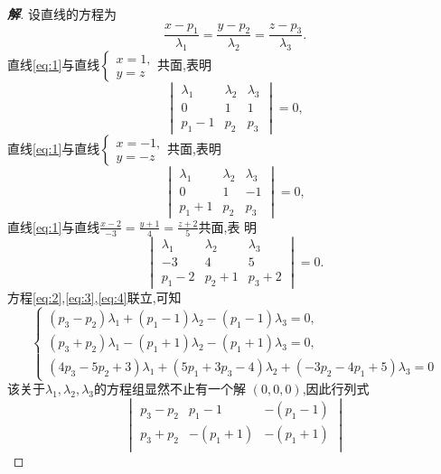 \documentclass[a4paper]{article}
\begin{document}
\begin{proof}[\textbf{解}]
 设直线的方程为
 \begin{equation}
   \label{eq:1}
   \frac{x-p_1}{\lambda_1}=\frac{y-p_2}{\lambda_2}=\frac{z-p_3}{\lambda_3}.
 \end{equation}
直线\eqref{eq:1}与直线$
\begin{cases}
  x=1,\\
y=z
\end{cases}
$共面,表明
\begin{equation}\label{eq:2}
\begin{vmatrix}
  \lambda_1&\lambda_2&\lambda_3\\
0&1&1\\
p_1-1&p_2&p_3
\end{vmatrix}=0,
\end{equation}
直线\eqref{eq:1}与直线$
\begin{cases}
  x=-1,\\
y=-z
\end{cases}
$共面,表明
\begin{equation}
  \label{eq:3}
  \begin{vmatrix}
    \lambda_1&\lambda_2&\lambda_3\\
0&1&-1\\
p_1+1&p_2&p_3
  \end{vmatrix}=0,
\end{equation}
直线\eqref{eq:1}与直线$\frac{x-2}{-3}=\frac{y+1}{4}=\frac{z+2}{5}$共面,表
明
\begin{equation}
  \label{eq:4}
  \begin{vmatrix}
    \lambda_1&\lambda_2&\lambda_3\\
-3&4&5\\
p_1-2&p_2+1&p_3+2
  \end{vmatrix}=0.
\end{equation}
方程\eqref{eq:2},\eqref{eq:3},\eqref{eq:4}联立,可知
$$
\begin{cases}
  (p_3-p_2)\lambda_1+(p_1-1)\lambda_2-(p_1-1)\lambda_3=0,\\
(p_3+p_2)\lambda_1-(p_1+1)\lambda_2-(p_1+1)\lambda_3=0,\\
(4p_3-5p_2+3)\lambda_1+(5p_1+3p_3-4)\lambda_2+(-3p_2-4p_1+5)\lambda_3=0
\end{cases}
$$
该关于$\lambda_1,\lambda_2,\lambda_3$的方程组显然不止有一个解
$(0,0,0)$,因此行列式
$$
\begin{vmatrix}
p_3-p_2&p_1-1&-(p_1-1)\\
p_3+p_2&-(p_1+1)&-(p_1+1)\\

\end{vmatrix}$$
\end{proof}
\end{document}
